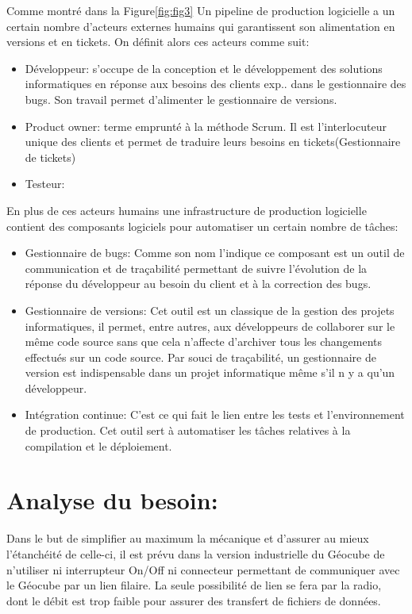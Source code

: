 \documentclass{themeensg}
\begin{document}
Comme montré dans la Figure\ref{fig:fig3} Un pipeline de production logicielle a un certain nombre d'acteurs externes humains qui garantissent son alimentation en versions et en tickets. On définit alors ces acteurs comme suit:

\begin{itemize}
\item Développeur: s'occupe de la conception et le développement des solutions informatiques en réponse aux besoins des clients exp.. dans le gestionnaire des bugs. Son travail permet d'alimenter le gestionnaire de versions.
\item Product owner: terme emprunté à la méthode Scrum. Il est l'interlocuteur unique des clients et permet de traduire leurs besoins en tickets(Gestionnaire de tickets)
\item Testeur: 
\end{itemize}
En plus de ces acteurs humains une infrastructure de production logicielle contient des composants logiciels pour automatiser un certain nombre de tâches:
\begin{itemize}
\item Gestionnaire de bugs: Comme son nom l'indique ce composant est un outil de communication et de traçabilité permettant de suivre l'évolution de la réponse du développeur au besoin du client et à la correction des bugs.
\item Gestionnaire de versions: Cet outil est un classique de la gestion des projets informatiques, il permet, entre autres, aux développeurs de collaborer sur le même code source sans que cela n'affecte d'archiver tous les changements effectués sur un code source. Par souci de traçabilité, un gestionnaire de version est indispensable dans un projet informatique même s'il n y a qu'un développeur.
\item Intégration continue: C'est ce qui fait le lien entre les tests et l'environnement de production. Cet outil sert à automatiser les tâches relatives à la compilation et le déploiement.
\end{itemize}



\section{Analyse du besoin:}
Dans le but de simplifier au maximum la mécanique et d’assurer au mieux l’étanchéité de celle-ci, il est prévu dans la version industrielle du Géocube de n’utiliser ni interrupteur On/Off ni connecteur permettant de communiquer avec le Géocube par un lien filaire. La seule possibilité de lien se fera par la radio, dont le débit est trop faible pour assurer des transfert de fichiers de données.
\end{document}
